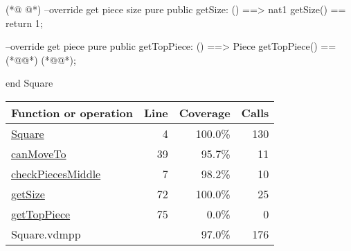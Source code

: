 \begin{vdmpp}[breaklines=true]
(*@
\label{getTopPiece:75}
@*)
  --override get piece size
  pure public getSize: () ==> nat1
  getSize() == return 1;
  
  --override get piece
  pure public getTopPiece: () ==> Piece
  getTopPiece() == (*@@*) (*@@*);

end Square
\end{vdmpp}
\bigskip
\begin{longtable}{|l|r|r|r|}
\hline
Function or operation & Line & Coverage & Calls \\
\hline
\hline
\hyperref[Square:4]{Square} & 4&100.0\% & 130 \\
\hline
\hyperref[canMoveTo:39]{canMoveTo} & 39&95.7\% & 11 \\
\hline
\hyperref[checkPiecesMiddle:7]{checkPiecesMiddle} & 7&98.2\% & 10 \\
\hline
\hyperref[getSize:72]{getSize} & 72&100.0\% & 25 \\
\hline
\hyperref[getTopPiece:75]{getTopPiece} & 75&0.0\% & 0 \\
\hline
\hline
Square.vdmpp & & 97.0\% & 176 \\
\hline
\end{longtable}

